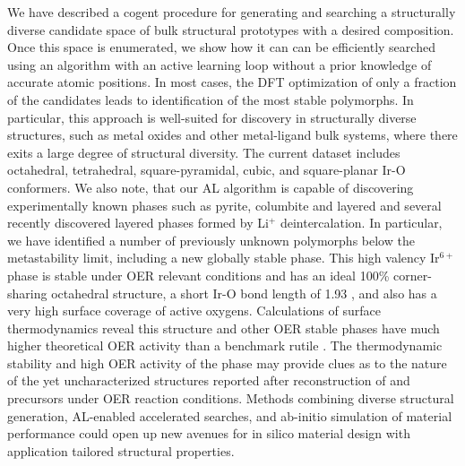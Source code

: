 


%
We have described a cogent procedure for generating and searching a structurally diverse candidate space of bulk structural prototypes with a desired composition.
%
Once this space is enumerated, we show how it can can be efficiently searched using an algorithm with an active learning loop without a prior knowledge of accurate atomic positions.
%
In most cases, the DFT optimization of only a fraction of the candidates leads to identification of the most stable polymorphs.
%
In particular, this approach is well-suited for discovery in structurally diverse structures, such as metal oxides and other metal-ligand bulk systems, where there exits a large degree of structural diversity.
%
The current dataset includes octahedral, tetrahedral, square-pyramidal, cubic, and square-planar Ir-O conformers.
%
We also note, that our AL algorithm is capable of discovering experimentally known phases such as pyrite, columbite and layered \IrOtwo and several recently discovered layered \IrOthree phases formed by Li$^+$ deintercalation.
%
In particular, we have identified a number of previously unknown \IrOthree polymorphs below the metastability limit, including a new globally stable \aIrOthree phase.
%
This high valency Ir$^{6+}$ phase is stable under OER relevant conditions and has an ideal 100\% corner-sharing octahedral structure, a short Ir-O bond length of 1.93 \angstrom, and also has a very high surface coverage of active oxygens.
%
Calculations of surface thermodynamics reveal this structure and other OER stable \IrOthree phases have much higher theoretical OER activity than a benchmark rutile \IrOtwo.
%
The thermodynamic stability and high OER activity of the \aIrOthree phase may provide clues as to the nature of the yet uncharacterized structures reported after reconstruction of  and \IrOx precursors under OER reaction conditions.
%
Methods combining diverse structural generation, AL-enabled accelerated searches, and \mbox{ab-initio} simulation of material performance could open up new avenues for in silico material design with application tailored structural properties.








